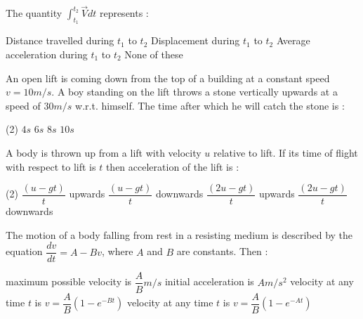\item The quantity $\int_{t_1}^{t_2} \vec{V} dt$ represents :
\begin{tasks}
\task Distance travelled during $t_1$ to $t_2$
\task Displacement during $t_1$ to $t_2$\ans
\task Average acceleration during $t_1$ to $t_2$
\task None of these
\end{tasks}

\item An open lift  is coming down from the top of a building at a constant speed $v=10 m/s$. A boy standing on the lift throws a stone vertically upwards at a speed of $30 m/s$ w.r.t. himself. The time after which he will catch the stone is :
\begin{tasks}(2)
\task $4 s$
\task $6 s$\ans
\task $8 s$
\task $10 s$
\end{tasks}


\item A body is thrown up from a lift with velocity $u$ relative to lift. If its time of flight with respect to lift is $t$ then acceleration of the lift is :
\begin{tasks}(2)
\task $\dfrac{(u-gt)}{t}$ upwards
\task $\dfrac{(u-gt)}{t}$ downwards
\task $\dfrac{(2u-gt)}{t}$ upwards\ans
\task $\dfrac{(2u-gt)}{t}$ downwards
\end{tasks}



\item The motion of a body falling from rest in a resisting medium is described by the equation $\dfrac{dv}{dt}=A-Bv$, where $A$ and $B$ are constants. Then :
\begin{tasks}
\task maximum possible velocity is $\dfrac{A}{B} m/s$\ans
\task initial acceleration is $A m/s^2$\ans
\task velocity at any time $t$ is $v=\dfrac{A}{B}(1-e^{-Bt})$\ans
\task velocity at any time $t$ is $v=\dfrac{A}{B}(1-e^{-At})$
\end{tasks}

